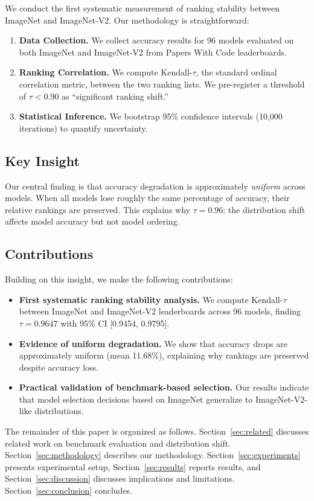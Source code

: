 We conduct the first systematic measurement of ranking stability between ImageNet and ImageNet-V2. Our methodology is straightforward:

\begin{enumerate}
    \item \textbf{Data Collection.} We collect accuracy results for 96 models evaluated on both ImageNet and ImageNet-V2 from Papers With Code leaderboards.
    \item \textbf{Ranking Correlation.} We compute Kendall-$\tau$, the standard ordinal correlation metric, between the two ranking lists. We pre-register a threshold of $\tau < 0.90$ as ``significant ranking shift.''
    \item \textbf{Statistical Inference.} We bootstrap 95\% confidence intervals (10,000 iterations) to quantify uncertainty.
\end{enumerate}

\subsection{Key Insight}

Our central finding is that accuracy degradation is approximately \emph{uniform} across models. When all models lose roughly the same percentage of accuracy, their relative rankings are preserved. This explains why $\tau = 0.96$: the distribution shift affects model accuracy but not model ordering.

\subsection{Contributions}

Building on this insight, we make the following contributions:

\begin{itemize}
    \item \textbf{First systematic ranking stability analysis.} We compute Kendall-$\tau$ between ImageNet and ImageNet-V2 leaderboards across 96 models, finding $\tau = 0.9647$ with 95\% CI [0.9454, 0.9795].
    \item \textbf{Evidence of uniform degradation.} We show that accuracy drops are approximately uniform (mean 11.68\%), explaining why rankings are preserved despite accuracy loss.
    \item \textbf{Practical validation of benchmark-based selection.} Our results indicate that model selection decisions based on ImageNet generalize to ImageNet-V2-like distributions.
\end{itemize}

The remainder of this paper is organized as follows. Section~\ref{sec:related} discusses related work on benchmark evaluation and distribution shift. Section~\ref{sec:methodology} describes our methodology. Section~\ref{sec:experiments} presents experimental setup, Section~\ref{sec:results} reports results, and Section~\ref{sec:discussion} discusses implications and limitations. Section~\ref{sec:conclusion} concludes.
